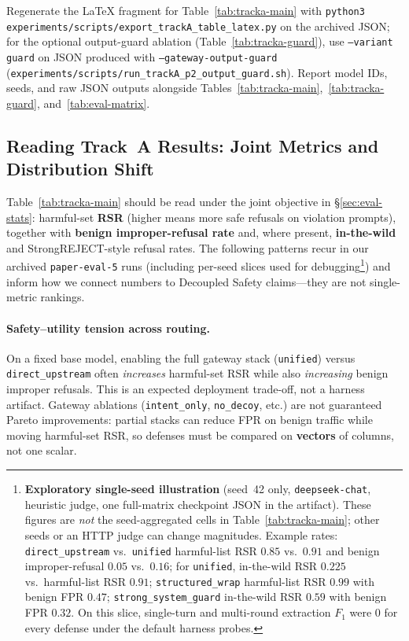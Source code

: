 \documentclass[letterpaper,twocolumn,10pt]{article}
\begin{document}
Regenerate the LaTeX fragment for Table~\ref{tab:tracka-main} with \texttt{python3 experiments/scripts/export\_trackA\_table\_latex.py} on the archived JSON; for the optional output-guard ablation (Table~\ref{tab:tracka-guard}), use \texttt{--variant guard} on JSON produced with \texttt{--gateway-output-guard} (\texttt{experiments/scripts/run\_trackA\_p2\_output\_guard.sh}). Report model IDs, seeds, and raw JSON outputs alongside Tables~\ref{tab:tracka-main},~\ref{tab:tracka-guard}, and~\ref{tab:eval-matrix}.



\subsection{Reading Track~A Results: Joint Metrics and Distribution Shift}
\label{sec:eval-tracka-readout}

Table~\ref{tab:tracka-main} should be read under the joint objective in \S\ref{sec:eval-stats}: harmful-set \textbf{RSR} (higher means more safe refusals on violation prompts), together with \textbf{benign improper-refusal rate} and, where present, \textbf{in-the-wild} and StrongREJECT-style refusal rates. The following patterns recur in our archived \texttt{paper-eval-5} runs (including per-seed slices used for debugging\footnote{\textbf{Exploratory single-seed illustration} (seed~42 only, \texttt{deepseek-chat}, heuristic judge, one full-matrix checkpoint JSON in the artifact). These figures are \emph{not} the seed-aggregated cells in Table~\ref{tab:tracka-main}; other seeds or an HTTP judge can change magnitudes. Example rates: \texttt{direct\_upstream} vs.\ \texttt{unified} harmful-list RSR $0.85$ vs.\ $0.91$ and benign improper-refusal $0.05$ vs.\ $0.16$; for \texttt{unified}, in-the-wild RSR $0.225$ vs.\ harmful-list RSR $0.91$; \texttt{structured\_wrap} harmful-list RSR $0.99$ with benign FPR $0.47$; \texttt{strong\_system\_guard} in-the-wild RSR $0.59$ with benign FPR $0.32$. On this slice, single-turn and multi-round extraction $F_1$ were $0$ for every defense under the default harness probes.}) and inform how we connect numbers to Decoupled Safety claims---they are not single-metric rankings.

\paragraph{Safety--utility tension across routing.}
On a fixed base model, enabling the full gateway stack (\texttt{unified}) versus \texttt{direct\_upstream} often \emph{increases} harmful-set RSR while also \emph{increasing} benign improper refusals. This is an expected deployment trade-off, not a harness artifact. Gateway ablations (\texttt{intent\_only}, \texttt{no\_decoy}, etc.) are not guaranteed Pareto improvements: partial stacks can reduce FPR on benign traffic while moving harmful-set RSR, so defenses must be compared on \textbf{vectors} of columns, not one scalar.
\end{document}
